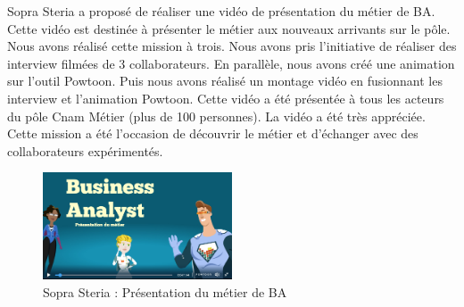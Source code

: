 Sopra Steria a proposé de réaliser une vidéo de présentation du métier de BA. Cette vidéo est destinée à présenter le métier aux nouveaux arrivants sur le pôle. Nous avons réalisé cette mission à trois. Nous avons pris l'initiative de réaliser des interview filmées de 3 collaborateurs. En parallèle, nous avons créé une animation sur l'outil Powtoon. Puis nous avons réalisé un montage vidéo en fusionnant les interview et l'animation Powtoon. Cette vidéo a été présentée à tous les acteurs du pôle Cnam Métier (plus de 100 personnes). La vidéo a été très appréciée. Cette mission a été l'occasion de découvrir le métier et d'échanger avec des collaborateurs expérimentés.

\begin{figure}[H]
\centering
\includegraphics[width=0.5\textwidth]{images/presBA.png}
\caption{Sopra Steria : Présentation du métier de BA}
\end{figure}
